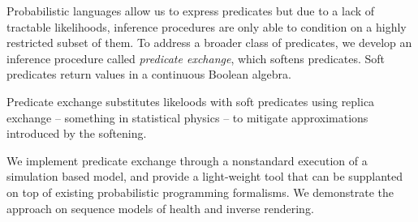Probabilistic languages allow us to express predicates but due to a lack of tractable likelihoods,  inference procedures are only able to condition on a highly restricted subset of them.
To address a broader class of predicates, we develop an inference procedure called \emph{predicate exchange}, which softens predicates.
Soft predicates return values in a continuous Boolean algebra.

Predicate exchange substitutes likeloods with soft predicates using replica exchange -- something in statistical physics -- to mitigate approximations introduced by the softening.



We implement predicate exchange through a nonstandard execution of a simulation based model, and provide a light-weight tool that can be supplanted on top of existing probabilistic programming formalisms. 
We demonstrate the approach on sequence models of health and inverse rendering. 



% 